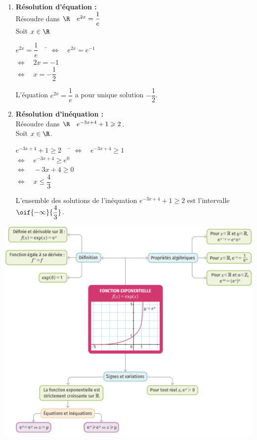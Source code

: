 \documentclass[a4paper,11pt,cours]{nsi} %
\begin{document}
\begin{exemple}[s]
	\begin{multicols}{2}
		\begin{enumerate}[label=\textbullet]
			\item 	\textbf{Résolution d'équation :}\\
			Résoudre dans $\R \quad e^{2x}=\dfrac{1}{e}$ \\
			Soit $x\in\R$
			\begin{tabbing}
				$e^{2x}=\dfrac{1}{e} \quad$		\=	$\Leftrightarrow\quad e^{2x}=e^{-1}$\\
				
				\>	$\Leftrightarrow\quad 2x=-1$\\
				\>	$\Leftrightarrow \quad x=-\dfrac{1}{2}$
			\end{tabbing}
			L'équation $e^{2x}=\dfrac{1}{e}$ a pour unique solution $-\dfrac{1}{2}$.
			\vspace{0.8cm}
			\item	\textbf{Résolution d'inéquation :}\\
			Résoudre dans $\R \quad e^{-3x+4}+1\geqslant2$.\\
			Soit $x\in\R$.
			\begin{tabbing}
				$e^{-3x+4}+1\geqslant2 \quad$		\=	$\Leftrightarrow\quad e^{-3x+4}\geqslant1$\\
				
				\>	$\Leftrightarrow\quad  e^{-3x+4}\geqslant e^{0}$\\
				
				\> $\Leftrightarrow\quad -3x+4\geqslant 0$\\
				
				\> $\Leftrightarrow\quad x\leqslant\dfrac{4}{3}$
			\end{tabbing}
			L'ensemble des solutions de l'inéquation $e^{-3x+4}+1\geqslant2$ est l'intervalle $\oif{-\infty}{\dfrac{4}{3}}$.
		\end{enumerate}
	\end{multicols}
	
	
\end{exemple}
\begin{aretenir}
\includegraphics[width=14.7cm]{cartementale}
\end{aretenir}
\end{document}
